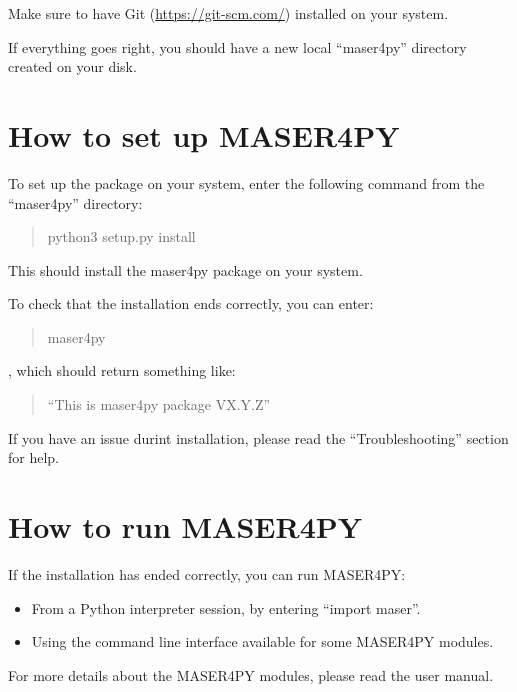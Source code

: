 \documentclass[letterpaper,10pt,english]{sphinxmanual}
\begin{document}
Make sure to have Git (\href{https://git-scm.com/}{https://git-scm.com/}) installed on your system.

If everything goes right, you should have a new local ``maser4py'' directory created on your disk.


\section{How to set up MASER4PY}
\label{intro:how-to-set-up-maser4py}
To set up the package on your system, enter the following
command from the ``maser4py'' directory:
\begin{quote}

python3 setup.py install
\end{quote}

This should install the maser4py package on your
system.

To check that the installation ends correctly, you can enter:
\begin{quote}

maser4py
\end{quote}

, which should return something like:
\begin{quote}

``This is maser4py package VX.Y.Z''
\end{quote}

If you have an issue durint installation, please read the ``Troubleshooting'' section for help.


\section{How to run MASER4PY}
\label{intro:how-to-run-maser4py}
If the installation has ended correctly, you can run MASER4PY:
\begin{itemize}
\item {} 
From a Python interpreter session, by entering ``import maser''.

\item {} 
Using the command line interface available for some MASER4PY modules.

\end{itemize}

For more details about the MASER4PY modules, please read the user manual.
\end{document}
